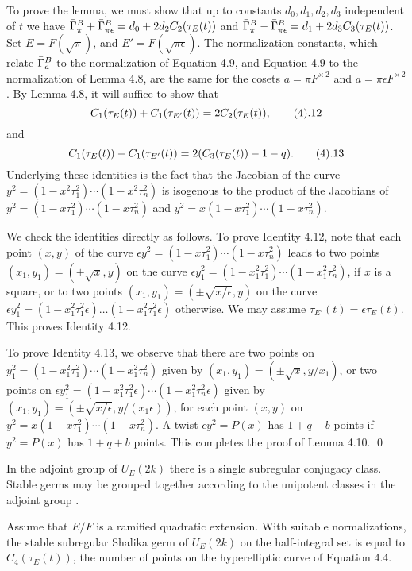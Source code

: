 To prove the lemma, we must show that up to constants $d_0,d_1,d_2,d_3$ 
independent of $t$ we have
$\bar\Gamma_\pi^B + \bar\Gamma_{\pi\epsilon}^B = d_0+ 2d_2 C_2(\tau_E(t))$
and 
$\bar\Gamma_\pi^B - \bar\Gamma_{\pi\epsilon}^B = d_1+ 2d_3 C_3(\tau_E(t))$.
Set $E= F(\sqrt{\pi})$, and
$E'=F(\sqrt{\pi\epsilon})$.  
The normalization constants, which relate $\bar\Gamma^B_a$ to the
normalization of Equation 4.9, and Equation 4.9 to the normalization
of Lemma 4.8, are the same for the cosets $a=\pi F^{\times\,2}$
and $a=\pi\epsilon F^{\times\,2}$.
By Lemma 4.8, it will suffice to show
that 
$$C_1(\tau_E(t)) + C_1(\tau_{E'}(t)) =2  C_2(\tau_E(t)),\tag4.12$$
and
$$C_1(\tau_E(t)) - C_1(\tau_{E'}(t)) = 2 (C_3(\tau_E(t))-1-q).\tag4.13$$
Underlying these identities is the fact that the Jacobian of the
curve $y^2 = (1-x^2\tau_1^2)\cdots (1-x^2\tau_n^2)$ is isogenous
to the product of the Jacobians of $y^2 = (1-x \tau_1^2)\cdots (1-x\tau_n^2)$ and $y^2 = x(1-x \tau_1^2)\cdots (1-x\tau_n^2)$.  

We check
the identities directly as follows.  To prove Identity 4.12, note that
each point $(x,y)$ of the curve $\epsilon y^2 = (1-x\tau_1^2)\cdots
(1-x\tau_n^2)$ leads to two points $(x_1,y_1) = (\pm\sqrt{x},y)$ on the
curve $\epsilon y_1^2 = (1- x_1^2\tau_1^2)\cdots (1-x_1^2 \tau_n^2)$,
if $x$ is a square,
or to two points $(x_1,y_1) = (\pm \sqrt{x/\epsilon},y)$ on the
curve $\epsilon y_1^2 = 
(1-x_1^2\tau_1^2\epsilon)\ldots(1-x_1^2 \tau_1^2\epsilon)$
otherwise.
We may assume $\tau_{E'}(t) = \epsilon \tau_E(t)$.
This proves Identity 4.12.

To prove Identity 4.13, we observe that there are two points on
$y_1^2 = (1-x_1^2\tau_1^2)\cdots (1-x_1^2\tau_n^2)$ given by
$(x_1,y_1) = (\pm \sqrt{x},y/x_1)$, or two points
on $\epsilon y_1^2 = (1-x_1^2\tau_1^2\epsilon)\cdots
   (1-x^2_1\tau_n^2\epsilon)$ given by $(x_1,y_1) 
= (\pm\sqrt{x/\epsilon},y/(x_1\epsilon))$,
for each point $(x,y)$ on $y^2=x(1-x\tau^2_1)\cdots (1-x\tau^2_n)$.
A twist $\epsilon y^2 = P(x)$
has $1+q-b$ points if $y^2 = P(x)$ has $1+q+b$ points.  This completes
the proof of Lemma 4.10. \qed\enddemo

\bigskip
In the adjoint group of $U_E(2k)$ there is a single 
subregular conjugacy class.  Stable germs may be grouped together
according to the unipotent classes in the adjoint group
\cite{H3,VII.5.4}.

  Assume that $E/F$ is a ramified quadratic
extension.  With suitable normalizations, the stable subregular Shalika
germ of $U_E(2k)$ on the half-integral set is equal to
$C_4(\tau_E(t))$, the number of points on the hyperelliptic
curve of Equation 4.4.
\endproclaim

